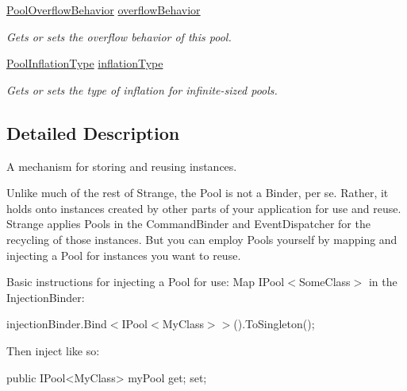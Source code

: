 \begin{DoxyCompactItemize}
\hyperlink{namespacestrange_1_1extensions_1_1pool_1_1api_afb1f831222aa94de2fcb447a88146ad0}{Pool\-Overflow\-Behavior} \hyperlink{interfacestrange_1_1extensions_1_1pool_1_1api_1_1_i_pool_a2883441f5785470a7d1359c99c7adf41}{overflow\-Behavior}
\begin{DoxyCompactList}\small\item\em Gets or sets the overflow behavior of this pool. \end{DoxyCompactList}\item 
\hyperlink{namespacestrange_1_1extensions_1_1pool_1_1api_ac2dc67ad647400c4637d72c282028180}{Pool\-Inflation\-Type} \hyperlink{interfacestrange_1_1extensions_1_1pool_1_1api_1_1_i_pool_aec2e1287c8eb3d188f70e0b121614d26}{inflation\-Type}
\begin{DoxyCompactList}\small\item\em Gets or sets the type of inflation for infinite-\/sized pools. \end{DoxyCompactList}\end{DoxyCompactItemize}


\subsection{Detailed Description}
A mechanism for storing and reusing instances. 

Unlike much of the rest of Strange, the Pool is not a Binder, per se. Rather, it holds onto instances created by other parts of your application for use and reuse. Strange applies Pools in the Command\-Binder and Event\-Dispatcher for the recycling of those instances. But you can employ Pools yourself by mapping and injecting a Pool for instances you want to reuse.

Basic instructions for injecting a Pool for use\-: Map I\-Pool$<$\-Some\-Class$>$ in the Injection\-Binder\-:

injection\-Binder.\-Bind$<$I\-Pool$<$\-My\-Class$>$$>$().To\-Singleton();

Then inject like so\-: \begin{DoxyVerb}[Inject]
public IPool<MyClass> myPool { get; set; }
\end{DoxyVerb}


